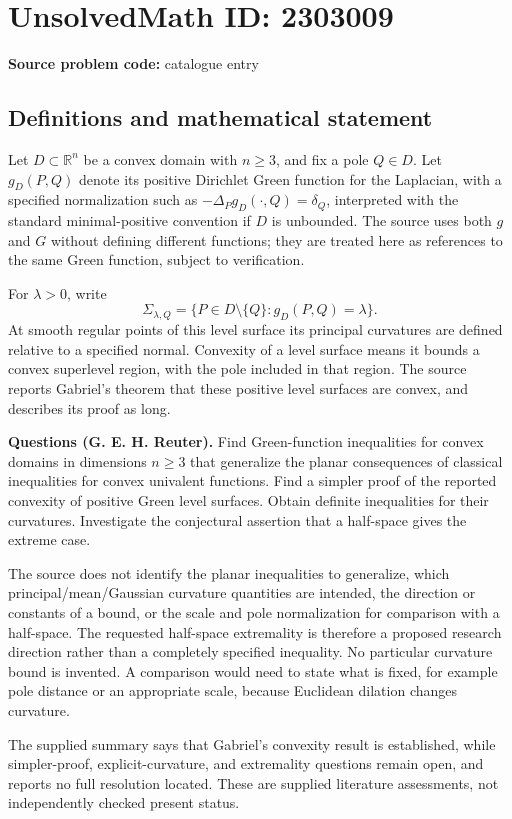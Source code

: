 \documentclass[11pt]{article}
\newcommand{\R}{\mathbb{R}}
\begin{document}
\section*{UnsolvedMath ID: 2303009}
\textbf{Source problem code:} catalogue entry
\subsection{Definitions and mathematical statement}
Let $D\subset\R^n$ be a convex domain with $n\geq3$, and fix a pole $Q\in D$. Let $g_D(P,Q)$ denote its positive Dirichlet Green function for the Laplacian, with a specified normalization such as $-\Delta_Pg_D(\cdot,Q)=\delta_Q$, interpreted with the standard minimal-positive convention if $D$ is unbounded. The source uses both $g$ and $G$ without defining different functions; they are treated here as references to the same Green function, subject to verification.

For $\lambda>0$, write
\[
 \Sigma_{\lambda,Q}=\{P\in D\setminus\{Q\}:g_D(P,Q)=\lambda\}.
\]
At smooth regular points of this level surface its principal curvatures are defined relative to a specified normal. Convexity of a level surface means it bounds a convex superlevel region, with the pole included in that region. The source reports Gabriel's theorem that these positive level surfaces are convex, and describes its proof as long.

\textbf{Questions (G. E. H. Reuter).} Find Green-function inequalities for convex domains in dimensions $n\geq3$ that generalize the planar consequences of classical inequalities for convex univalent functions. Find a simpler proof of the reported convexity of positive Green level surfaces. Obtain definite inequalities for their curvatures. Investigate the conjectural assertion that a half-space gives the extreme case.

The source does not identify the planar inequalities to generalize, which principal/mean/Gaussian curvature quantities are intended, the direction or constants of a bound, or the scale and pole normalization for comparison with a half-space. The requested half-space extremality is therefore a proposed research direction rather than a completely specified inequality. No particular curvature bound is invented. A comparison would need to state what is fixed, for example pole distance or an appropriate scale, because Euclidean dilation changes curvature.

The supplied summary says that Gabriel's convexity result is established, while simpler-proof, explicit-curvature, and extremality questions remain open, and reports no full resolution located. These are supplied literature assessments, not independently checked present status.
\end{document}
